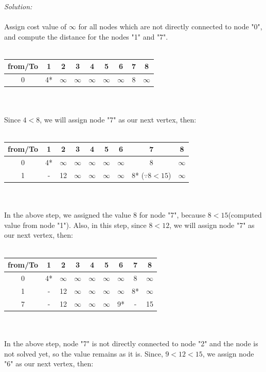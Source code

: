 \textit{Solution:}\\\\
Assign cost value of $\infty$ for all nodes which are not directly connected to node "0", and compute the distance for the nodes "1" and "7".\\\\
\begin{tabular}{c | c| c| c| c| c| c| c| c}
	from/To & 1 & 2 & 3 & 4 & 5 & 6 & 7 & 8 \\
	\hline
	0 & 4* & $\infty$ & $\infty$& $\infty$& $\infty$& $\infty$ & 8 & $\infty$\\
\end{tabular}\\\\
Since $ 4 < 8 $, we will assign node "7" as our next vertex, then:\\\\
\begin{tabular}{c | c| c| c| c| c| c| c| c}
	from/To & 1 & 2 & 3 & 4 & 5 & 6 & 7 & 8 \\
	\hline
	0 & 4* & $\infty$ & $\infty$& $\infty$& $\infty$& $\infty$ & 8 & $\infty$\\
	1 & - & 12 & $\infty$& $\infty$& $\infty$& $\infty$ & 8* ($\because 8 < 15$) & $\infty$\\
\end{tabular}\\\\
In the above step, we assigned the value 8 for node "7", because $ 8 < 15 $(computed value from node "1"). Also, in this step, since $ 8 < 12 $, we will assign node "7" as our next vertex, then:\\\\
\begin{tabular}{c | c| c| c| c| c| c| c| c}
	from/To & 1 & 2 & 3 & 4 & 5 & 6 & 7 & 8 \\
	\hline
	0 & 4* & $\infty$ & $\infty$& $\infty$& $\infty$& $\infty$ & 8 & $\infty$\\
	1 & - & 12 & $\infty$& $\infty$& $\infty$& $\infty$ & 8* & $\infty$\\
	7 & - & 12 & $\infty$& $\infty$& $\infty$& 9* & - & 15\\
\end{tabular}\\\\
In the above step, node "7" is not directly connected to node "2" and the node is not solved yet, so the value remains as it is. Since, $ 9 < 12 < 15 $, we assign node "6" as our next vertex, then:\\\\
